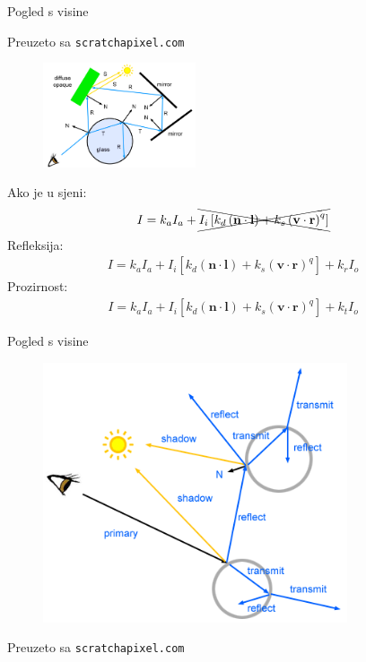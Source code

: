 \documentclass[9pt]{beamer}
\begin{document}
\begin{frame}{Pogled s visine}
\begin{tiny}
	Preuzeto sa \texttt{scratchapixel.com}
\end{tiny}

\begin{figure}
	\includegraphics[width=0.4\textwidth]{./slike/rt-whitted-example.png}	
\end{figure}
Ako je u sjeni:
\begin{align*}
I = k_aI_a + \xcancel{I_i\left[k_d\left(\mathbf{n}\cdot\mathbf{l}\right)+
k_s\left(\mathbf{v}\cdot\mathbf{r}\right)^q\right]}
\end{align*}
Refleksija:
\begin{align*}
I = k_aI_a + I_i\left[k_d\left(\mathbf{n}\cdot\mathbf{l}\right)+
	k_s\left(\mathbf{v}\cdot\mathbf{r}\right)^q\right] + k_rI_o
\end{align*}
Prozirnost:
\begin{align*}
I = k_aI_a + I_i\left[k_d\left(\mathbf{n}\cdot\mathbf{l}\right)+
k_s\left(\mathbf{v}\cdot\mathbf{r}\right)^q\right] + k_tI_o
\end{align*}
\end{frame}

\begin{frame}{Pogled s visine}
\begin{figure}
	\includegraphics[width=0.8\textwidth]{./slike/rt-recursive.png}
\end{figure}
\tiny{Preuzeto sa \texttt{scratchapixel.com}}
\end{frame}
\end{document}

